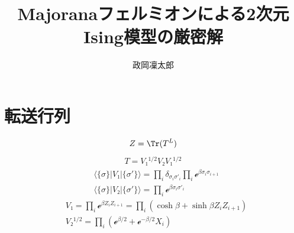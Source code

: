 \documentclass[12pt]{ltjsarticle}
\begin{document}
\title{Majoranaフェルミオンによる2次元Ising模型の厳密解}
\author{政岡凜太郎}
\maketitle

\section{転送行列}

\begin{align}
    Z = \Tr(T^L)
\end{align}
\begin{align}
    T = V₁^{1/2}V₂V₁^{1/2}
\end{align}
\begin{align}&
    ⟨\{σ\}|V₁|\{σ'\}⟩ = ∏_i δ_{σ_iσ'_i} ∏_i ℯ^{βσ_iσ_{i+1}} \\
    &
    ⟨\{σ\}|V₂|\{σ'\}⟩ = ∏_i ℯ^{βσ_iσ'_i}
\end{align}
\begin{align}&
    V₁ = ∏_i ℯ^{βZ_iZ_{i+1}} = ∏_i(\cosh β + \sinh β Z_iZ_{i+1} ) \\
    &
    V₂^{1/2} = ∏_i (ℯ^{β/2} + ℯ^{-β/2} X_i)
\end{align}
\end{document}
